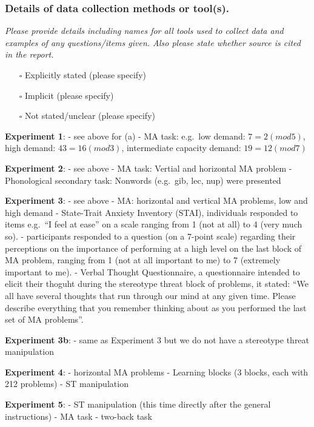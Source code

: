 \documentclass[
  doc, a4paper]{apa7}
\providecommand{\tightlist}{%
  \setlength{\itemsep}{0pt}\setlength{\parskip}{0pt}}
\begin{document}
\subsubsection{Details of data collection methods or tool(s).}\label{details-of-data-collection-methods-or-tools.}

\emph{Please provide details including names for all tools used to collect data and examples of any questions/items given. Also please state whether source is cited in the report.}

\begin{itemize}
\tightlist
\item[$\square$]
  Explicitly stated (please specify)
\item[$\square$]
  Implicit (please specify)
\item[$\square$]
  Not stated/unclear (please specify)
\end{itemize}

\textbf{Experiment 1}:
- see above for (a)
- MA task: e.g.~low demand: \(7 = 2 (mod 5)\), high demand: \(43 = 16 (mod 3)\), intermediate capacity demand: \(19 = 12 (mod 7)\)

\textbf{Experiment 2}:
- see above
- MA task: Vertial and horizontal MA problem
- Phonological secondary task: Nonwords (e.g.~gib, lec, nup) were presented

\textbf{Experiment 3}:
- see above
- MA: horizontal and vertical MA problems, low and high demand
- State-Trait Anxiety Inventory (STAI), individuals responded to items e.g.~``I feel at ease'' on a scale ranging from 1 (not at all) to 4 (very much so).
- participants responded to a question (on a 7-point scale) regarding their perceptions on the importance of performing at a high level on the last block of MA problem, ranging from 1 (not at all important to me) to 7 (extremely important to me).
- Verbal Thought Questionnaire, a questionnaire intended to elicit their thoguht during the stereotype threat block of problems, it stated: ``We all have several thoughts that run through our mind at any given time. Please describe everything that you remember thinking about as you performed the last set of MA problems''.

\textbf{Experiment 3b}:
- same as Experiment 3 but we do not have a stereotype threat manipulation

\textbf{Experiment 4}:
- horizontal MA problems
- Learning blocks (3 blocks, each with 212 problems)
- ST manipulation

\textbf{Experiment 5}:
- ST manipulation (this time directly after the general instructions)
- MA task
- two-back task
\end{document}
